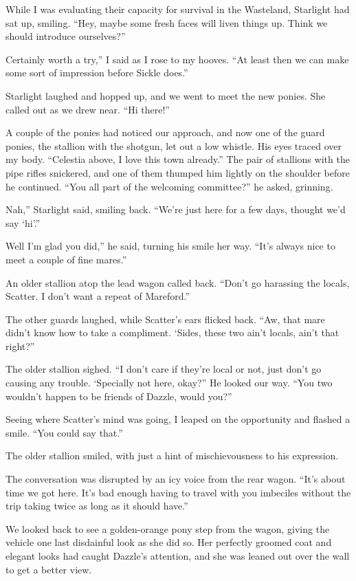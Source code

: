 While I was evaluating their capacity for survival in the Wasteland, Starlight had sat up, smiling. “Hey, maybe some fresh faces will liven things up. Think we should introduce ourselves?”

\leavevmode{}Certainly worth a try,” I said as I rose to my hooves. “At least then we can make some sort of impression before Sickle does.”

Starlight laughed and hopped up, and we went to meet the new ponies. She called out as we drew near. “Hi there!”

A couple of the ponies had noticed our approach, and now one of the guard ponies, the stallion with the shotgun, let out a low whistle. His eyes traced over my body. “Celestia above, I love this town already.” The pair of stallions with the pipe rifles snickered, and one of them thumped him lightly on the shoulder before he continued. “You all part of the welcoming committee?” he asked, grinning.

\leavevmode{}Nah,” Starlight said, smiling back. “We’re just here for a few days, thought we’d say ‘hi’.”

\leavevmode{}Well I’m glad you did,” he said, turning his smile her way. “It’s always nice to meet a couple of fine mares.”

An older stallion atop the lead wagon called back. “Don’t go harassing the locals, Scatter. I don’t want a repeat of Mareford.”

The other guards laughed, while Scatter’s ears flicked back. “Aw, that mare didn’t know how to take a compliment. ‘Sides, these two ain’t locals, ain’t that right?”

The older stallion sighed. “I don’t care if they’re local or not, just don’t go causing any trouble. ‘Specially not here, okay?” He looked our way. “You two wouldn’t happen to be friends of Dazzle, would you?”

Seeing where Scatter’s mind was going, I leaped on the opportunity and flashed a smile. “You could say that.”

The older stallion smiled, with just a hint of mischievousness to his expression.

The conversation was disrupted by an icy voice from the rear wagon. “It’s about time we got here. It’s bad enough having to travel with you imbeciles without the trip taking twice as long as it should have.”

We looked back to see a golden-orange pony step from the wagon, giving the vehicle one last disdainful look as she did so. Her perfectly groomed coat and elegant looks had caught Dazzle’s attention, and she was leaned out over the wall to get a better view.

